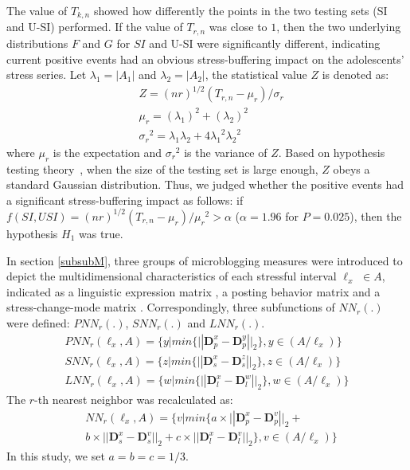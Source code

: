 The value of $T_{k,n}$ showed how differently the points in the two testing sets (SI and U-SI) performed.
If the value of $T_{r,n}$ was close to $1$, 
then the two underlying distributions $F$ and $G$ for $SI$ and U-SI were significantly different,
indicating current positive events had an obvious stress-buffering impact on the adolescents' stress series.
Let $\lambda_1=|A_1|$ and $\lambda_2=|A_2|$, the statistical value $Z$ is denoted as:
\begin{align}
&Z=(nr)^{1/2}(T_{r,n}-\mu_{r})/\sigma_{r}\\
&\mu_r=(\lambda_1)^2+(\lambda_2)^2\\
&{\sigma_r}^2=\lambda_1\lambda_2+4{\lambda_1}^2{\lambda_2}^2
\end{align}
where $\mu_r$ is the expectation and ${\sigma_r}^2$ is the variance of $Z$. 
Based on hypothesis testing theory~\citep{Johnson2012Applied},
when the size of the testing set is large enough, 
$Z$ obeys a standard Gaussian distribution.
Thus, we judged whether the positive events had a significant stress-buffering impact as follows: 
if $f(SI,USI)=(nr)^{1/2}(T_{r,n}-\mu_{r})/{\mu_r}^2>\alpha$ ($\alpha = 1.96$ for $P=0.025$),
then the hypothesis $H_1$ was true. 

In section \ref{subsubM},
three groups of microblogging measures 
were introduced to depict the multidimensional characteristics of each stressful interval $\ell_x$ $\in A$,
indicated as a linguistic expression matrix , a posting behavior matrix 
and a stress-change-mode matrix .
Correspondingly, three subfunctions of $NN_r(.)$ were defined: $PNN_r(.)$, $SNN_r(.)$ and $LNN_r(.)$.
\begin{equation}
\begin{aligned}
& PNN_r(\ell_x,A)
= \{y | min\{||\textbf{D}_p^x-\textbf{D}_p^y ||_2\}, y\in(A/\ell_x)\} &\\
& SNN_r(\ell_x,A)
= \{z | min\{||\textbf{D}_s^x-\textbf{D}_s^z ||_2\}, z\in(A/\ell_x)\} \\
& LNN_r(\ell_x,A)
= \{w | min\{||\textbf{D}_l^x-\textbf{D}_l^w ||_2\}, w\in(A/\ell_x)\} &
 \end{aligned}
 \end{equation}
The $r$-th nearest neighbor was recalculated as: 
\begin{align}
&NN_r(\ell_x,A) = \{v | min\{a \times ||\textbf{D}_p^x-\textbf{D}_p^v||_2+\\
&b \times ||\textbf{D}_s^x-\textbf{D}_s^v||_2+
c \times ||\textbf{D}_l^x-\textbf{D}_l^v||_2\}, v\in(A/\ell_x) \}
\end{align}
In this study, we set $a = b = c = 1/3$.


